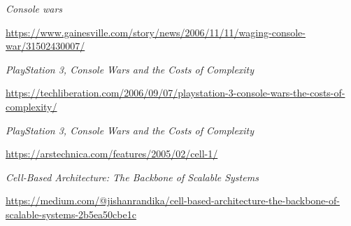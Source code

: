 \documentclass[10pt,compsoc]{IEEEtran}
\begin{document}
\begin{thebibliography}{1}
			{\it{Console wars}}
			
			\url{https://www.gainesville.com/story/news/2006/11/11/waging-console-war/31502430007/}\newline
			
			{\it{PlayStation 3, Console Wars and the Costs of Complexity}}
				
			\url{https://techliberation.com/2006/09/07/playstation-3-console-wars-the-costs-of-complexity/}\newline
			
			
			{\it{PlayStation 3, Console Wars and the Costs of Complexity}}
					
			\url{https://arstechnica.com/features/2005/02/cell-1/}\newline
			
			{\it{Cell-Based Architecture: The Backbone of Scalable Systems}}
			 			
			\url{https://medium.com/@jishanrandika/cell-based-architecture-the-backbone-of-scalable-systems-2b5ea50cbe1c}
			
		
		\end{thebibliography}
		
			
	
		
\end{document}
